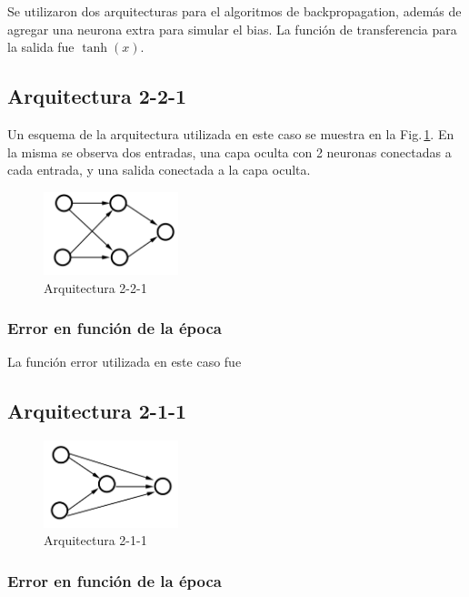 Se utilizaron dos arquitecturas para el algoritmos de backpropagation, además de agregar una neurona extra para simular el bias. La función de transferencia para la salida fue $\tanh({x})$.

\subsection*{Arquitectura 2-2-1}

Un esquema de la arquitectura utilizada en este caso se muestra en la Fig.\,\ref{fig:arq-221}. En la misma se observa dos entradas, una capa oculta con 2 neuronas conectadas a cada entrada, y una salida conectada a la capa oculta.
\begin{figure}[H]
	\centering
	\includegraphics[width=0.35\textwidth]{ejer_1_221.png}
	\caption{Arquitectura 2-2-1}
	\label{fig:arq-221}
\end{figure}

\subsubsection*{Error en función de la época}

La función error utilizada en este caso  fue 

\subsection*{Arquitectura 2-1-1}


\begin{figure}[H]
	\centering
	\includegraphics[width=0.35\textwidth]{ejer_1_211.png}
	\caption{Arquitectura 2-1-1}
	\label{fig:arq-211}
\end{figure}
\subsubsection*{Error en función de la época}

